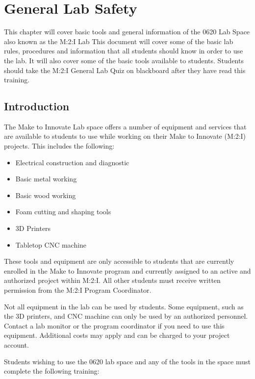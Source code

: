 
\chapter{General Lab Safety}

This chapter will cover basic tools and general information of the 0620 Lab Space also known as the M:2:I Lab  This document will cover some of the basic lab rules, procedures and information that all students should know in order to use the lab.  It will also cover some of the basic tools available to students.  Students should take the M:2:I General Lab Quiz on blackboard after they have read this training.

\section{Introduction}

The Make to Innovate Lab space offers a number of equipment and services that are available to students to use while working on their Make to Innovate (M:2:I) projects.  This includes the following:

\begin{itemize}
\item Electrical construction and diagnostic
\item Basic metal working
\item Basic wood working
\item Foam cutting and shaping tools
\item 3D Printers
\item Tabletop CNC machine
\end{itemize}

These tools and equipment are only accessible to students that are currently enrolled in the Make to Innovate program and currently assigned to an active and authorized project within M:2:I.  All other students must receive written permission from the M:2:I Program Coordinator.

Not all equipment in the lab can be used by students.  Some equipment, such as the 3D printers, and CNC machine can only be used by an authorized personnel.  Contact a lab monitor or the program coordinator if you need to use this equipment.  Additional costs may apply and can be charged to your project account.

Students wishing to use the 0620 lab space and any of the tools in the space must complete the following training:

